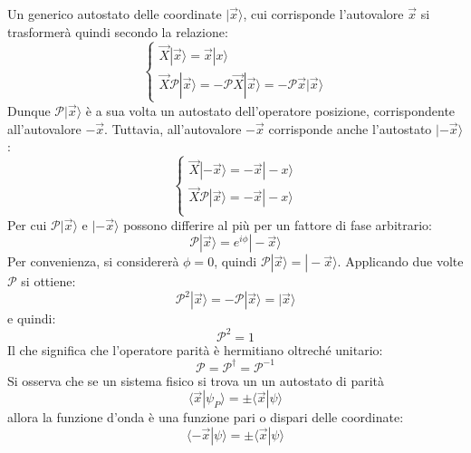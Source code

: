 Un generico autostato delle coordinate $|\vec{x}\rangle$, cui corrisponde l'autovalore $\vec{x}$ si trasformer\`a quindi secondo la relazione:
 \begin{displaymath}
\left\{
\begin{array}{l}
\vec{X}|\vec{x}\rangle = \vec{x}|x\rangle\\
\vec{X}\mathscr{P}|\vec{x}\rangle = -\mathscr{P}\vec{X}|\vec{x}\rangle = -\mathscr{P}\vec{x}|\vec{x}\rangle
\end{array}
\right.
\end{displaymath}
Dunque $\mathscr{P}|\vec{x}\rangle$ è a sua volta un autostato dell'operatore posizione, corrispondente all'autovalore $-\vec{x}$.
Tuttavia, all'autovalore $-\vec{x}$ corrisponde anche l'autostato $|-\vec{x}\rangle$:
 \begin{displaymath}
\left\{
\begin{array}{l}
\vec{X}|-\vec{x}\rangle = -\vec{x}|-x\rangle\\
\vec{X}\mathscr{P}|\vec{x}\rangle = -\vec{x}|-x\rangle\\
\end{array}
\right.
\end{displaymath}
Per cui $\mathscr{P}|\vec{x}\rangle$ e $|-\vec{x}\rangle$ possono differire al più per un fattore di fase arbitrario:
\begin{equation}
\mathscr{P}|\vec{x}\rangle = e^{i\phi}|-\vec{x}\rangle
\end{equation}
Per convenienza, si considererà $\phi = 0$, quindi
$\mathscr{P}|\vec{x}\rangle = |-\vec{x}\rangle$. Applicando due
volte $\mathscr{P}$ si ottiene:
\begin{equation}
\mathscr{P}^2|\vec{x}\rangle = -\mathscr{P}|\vec{x}\rangle = |\vec{x}\rangle
\end{equation}
e quindi:
\begin{equation}
\mathscr{P}^2= 1
\end{equation}
Il che significa che l'operatore parità è hermitiano oltreché unitario:
\begin{equation}
\mathscr{P} = \mathscr{P}^{\dag} = \mathscr{P}^{-1}
\end{equation}
Si osserva che se un sistema fisico si trova un un autostato di parità
\begin{equation}
\langle\vec{x} | \psi_{P}\rangle = \pm \langle\vec{x} | \psi\rangle
\end{equation}
allora la funzione d'onda \`e una funzione pari o dispari delle coordinate:
\begin{equation}
\langle - \vec{x} | \psi\rangle = \pm \langle\vec{x} | \psi\rangle
\end{equation}
